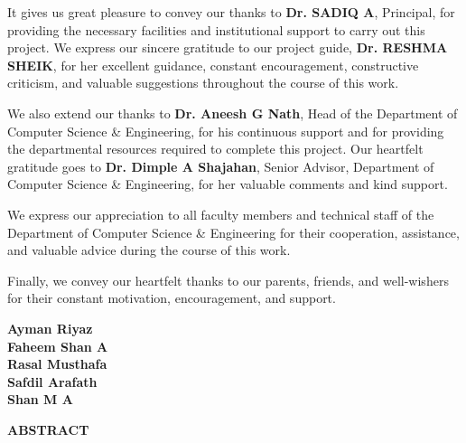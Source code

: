 \documentclass[12pt,a4paper,oneside]{report}
\begin{document}
It gives us great pleasure to convey our thanks to \textbf{Dr. SADIQ A}, Principal, for providing the necessary facilities and institutional support to carry out this project. We express our sincere gratitude to our project guide, \textbf{Dr. RESHMA SHEIK}, for her excellent guidance, constant encouragement, constructive criticism, and valuable suggestions throughout the course of this work.

We also extend our thanks to \textbf{Dr. Aneesh G Nath}, Head of the Department of Computer Science \& Engineering, for his continuous support and for providing the departmental resources required to complete this project. Our heartfelt gratitude goes to \textbf{Dr. Dimple A Shajahan}, Senior Advisor, Department of Computer Science \& Engineering, for her valuable comments and kind support.

We express our appreciation to all faculty members and technical staff of the Department of Computer Science \& Engineering for their cooperation, assistance, and valuable advice during the course of this work.

Finally, we convey our heartfelt thanks to our parents, friends, and well-wishers for their constant motivation, encouragement, and support.

\vspace{0.5cm}
\textbf{Ayman Riyaz}\\
\textbf{Faheem Shan A}\\
\textbf{Rasal Musthafa}\\
\textbf{Safdil Arafath}\\
\textbf{Shan M A}

\clearpage
\thispagestyle{plain}
\begin{center}
\vspace*{0.3cm}
{\Large\bfseries ABSTRACT\par}
\vspace{0.8cm}
\end{center}
\end{document}
